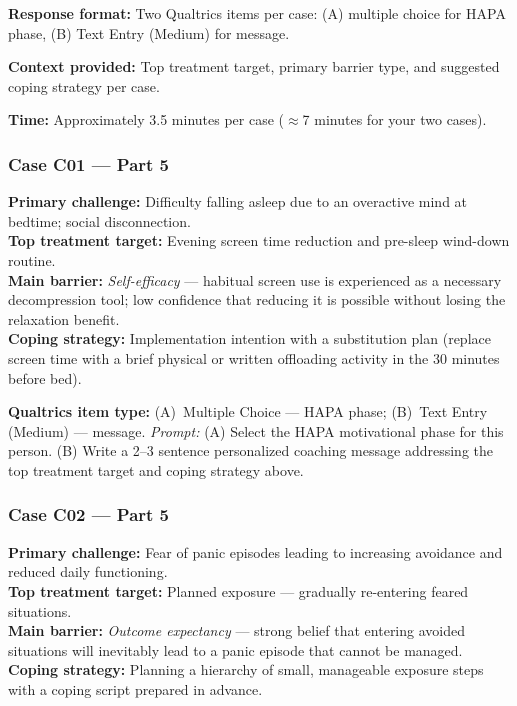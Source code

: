 \documentclass[11pt,a4paper]{article}
\newcommand{\haparesponse}[1]{\begin{tcolorbox}[colback=ResponseBG,colframe=GoldAmber,boxrule=0.6pt,arc=1.5mm,left=6pt,right=6pt,top=5pt,bottom=5pt]\small\textbf{\color{GoldAmber}Qualtrics item type:} (A)~Multiple Choice --- HAPA phase; (B)~Text Entry (Medium) --- message. \quad \textit{Prompt:} #1\end{tcolorbox}}
\begin{document}
\begin{tcolorbox}[colback=PartFiveBG,colframe=TealGreen,arc=2.5mm,boxrule=0.9pt,left=10pt,right=10pt,top=9pt,bottom=9pt]
\textbf{Response format:} Two Qualtrics items per case: (A) multiple choice for HAPA phase, (B) Text Entry (Medium) for message.

\textbf{Context provided:} Top treatment target, primary barrier type, and suggested coping strategy per case.

\textbf{Time:} Approximately 3.5 minutes per case ($\approx$7 minutes for your two cases).
\end{tcolorbox}

\vspace{0.5em}

\subsubsection*{Case C01 --- Part 5}

\begin{contextbox}
\small
\textbf{Primary challenge:} Difficulty falling asleep due to an overactive mind at bedtime; social disconnection.\\
\textbf{Top treatment target:} Evening screen time reduction and pre-sleep wind-down routine.\\
\textbf{Main barrier:} \textit{Self-efficacy} --- habitual screen use is experienced as a necessary decompression tool; low confidence that reducing it is possible without losing the relaxation benefit.\\
\textbf{Coping strategy:} Implementation intention with a substitution plan (replace screen time with a brief physical or written offloading activity in the 30 minutes before bed).
\end{contextbox}

\haparesponse{(A) Select the HAPA motivational phase for this person. (B) Write a 2--3 sentence personalized coaching message addressing the top treatment target and coping strategy above.}

\vspace{0.4em}

\subsubsection*{Case C02 --- Part 5}

\begin{contextbox}
\small
\textbf{Primary challenge:} Fear of panic episodes leading to increasing avoidance and reduced daily functioning.\\
\textbf{Top treatment target:} Planned exposure --- gradually re-entering feared situations.\\
\textbf{Main barrier:} \textit{Outcome expectancy} --- strong belief that entering avoided situations will inevitably lead to a panic episode that cannot be managed.\\
\textbf{Coping strategy:} Planning a hierarchy of small, manageable exposure steps with a coping script prepared in advance.
\end{contextbox}
\end{document}
